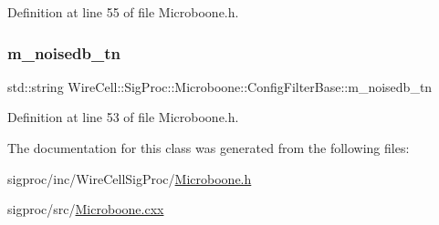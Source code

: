 Definition at line 55 of file Microboone.\+h.

\mbox{\label{class_wire_cell_1_1_sig_proc_1_1_microboone_1_1_config_filter_base_a62a4e3cf2599f8fb215245a435fc1cba}} 
\subsubsection{\texorpdfstring{m\+\_\+noisedb\+\_\+tn}{m\_noisedb\_tn}}
{\footnotesize\ttfamily std\+::string Wire\+Cell\+::\+Sig\+Proc\+::\+Microboone\+::\+Config\+Filter\+Base\+::m\+\_\+noisedb\+\_\+tn\hspace{0.3cm}{\ttfamily [protected]}}



Definition at line 53 of file Microboone.\+h.



The documentation for this class was generated from the following files\+:\begin{DoxyCompactItemize}
\item 
sigproc/inc/\+Wire\+Cell\+Sig\+Proc/\hyperlink{_microboone_8h}{Microboone.\+h}\item 
sigproc/src/\hyperlink{_microboone_8cxx}{Microboone.\+cxx}\end{DoxyCompactItemize}

